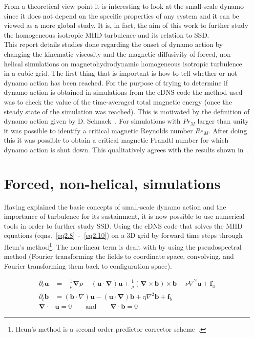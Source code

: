 \documentclass[a4paper,12pt]{article}
\begin{document}
From a theoretical view point it is interesting to look at the small-scale dynamo since it does not depend on the specific properties of any system and it can be viewed as a more global study. It is, in fact, the aim of this work to further study the homogeneous isotropic MHD turbulence and its relation to SSD. \\



This report details studies done regarding the onset of dynamo action by changing the kinematic viscosity and the magnetic diffusivity of forced, non-helical simulations on magnetohydrodynamic homogeneous isotropic turbulence in a cubic grid. The first thing that is important is how to tell whether or not dynamo action has been reached. For the purpose of trying to determine if dynamo action is obtained in simulations from the eDNS code the method used was to check the value of the time-averaged total magnetic energy (once the steady state of the simulation was reached). This is motivated by the definition of dynamo action given by D. Schnack~\cite{schnack2009lectures}. For simulations with $Pr_M$ larger than unity it was possible to identify a critical magnetic Reynolds number $Re_M$. After doing this it was possible to obtain a critical magnetic Prandtl number for which dynamo action is shut down. This qualitatively agrees with the results shown in~\cite{schekochihin2004critical}.

\section{Forced, non-helical, simulations}

Having explained the basic concepts of small-scale dynamo action and the importance of turbulence for its sustainment, it is now possible to use numerical tools in order to further study SSD. Using the eDNS code that solves the MHD equations (eqns.~\ref{eq2.8}~-~\ref{eq2.10}) on a 3D grid by forward time steps through Heun's method\footnote{Heun's method is a second order predictor corrector scheme~\cite{LinkmannMoritzFrederikLeon2016Spim}.}. The non-linear term is dealt with by using the pseudospectral method (Fourier transforming the fields to coordinate space, convolving, and Fourier transforming them back to configuration space).

\begin{align}
 \partial_t \bm u &= - \frac{1}{\rho} \bm \nabla p - (\bm u \cdot \bm \nabla) \bm u + \frac{1}{\rho} (\bm \nabla \times \bm b) \times \bm b + \nu \nabla^2 \bm u + \bm f_u \label{eq2.8} \\
\partial_t \bm b &= (\bm b \cdot \nabla) \bm u - (\bm u \cdot \bm \nabla) \bm b + \eta \nabla^2 \bm b + \bm f_b \label{eq2.9} \\
\bm \nabla \cdot &\bm u = 0 \qquad \text{and} \qquad \bm \nabla \cdot \bm b = 0 \label{eq2.10}
\end{align}
\end{document}

